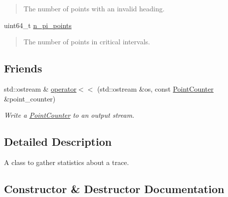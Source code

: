 \begin{DoxyCompactItemize}
\begin{DoxyCompactList}\small\item\em \begin{quote}
The number of points with an invalid heading. \end{quote}
\end{DoxyCompactList}\item 
uint64\+\_\+t \hyperlink{structcvdi_1_1PointCounter_a6eda31fe450485d5a90403aa22dc51b9}{n\+\_\+pi\+\_\+points}\hypertarget{structcvdi_1_1PointCounter_a6eda31fe450485d5a90403aa22dc51b9}{}\label{structcvdi_1_1PointCounter_a6eda31fe450485d5a90403aa22dc51b9}

\begin{DoxyCompactList}\small\item\em \begin{quote}
The number of points in critical intervals. \end{quote}
\end{DoxyCompactList}\end{DoxyCompactItemize}
\subsection*{Friends}
\begin{DoxyCompactItemize}
\item 
std\+::ostream \& \hyperlink{structcvdi_1_1PointCounter_a7d38a9212813c666452f29a6bc89de6c}{operator$<$$<$} (std\+::ostream \&os, const \hyperlink{structcvdi_1_1PointCounter}{Point\+Counter} \&point\+\_\+counter)
\begin{DoxyCompactList}\small\item\em Write a \hyperlink{structcvdi_1_1PointCounter}{Point\+Counter} to an output stream. \end{DoxyCompactList}\end{DoxyCompactItemize}


\subsection{Detailed Description}
A class to gather statistics about a trace. 

\subsection{Constructor \& Destructor Documentation}
